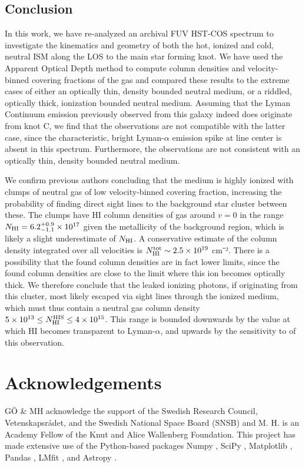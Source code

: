 \documentclass[twocolumn]{aastex61}
\begin{document}
\subsection{Conclusion}\label{conclusion}

In this work, we have re-analyzed an archival FUV HST-COS spectrum to
investigate the kinematics and geometry of both the hot, ionized and
cold, neutral ISM along the LOS to the main star forming knot. We have
used the Apparent Optical Depth method to compute column densities and
velocity-binned covering fractions of the gas and compared these results
to the extreme cases of either an optically thin, density bounded
neutral medium, or a riddled, optically thick, ionization bounded
neutral medium. Assuming that the Lyman Continuum emission previously
observed from this galaxy indeed does originate from knot C, we find
that the observations are not compatible with the latter case, since the
characteristic, bright Lyman-$\alpha$ emission spike at line center is
absent in this spectrum. Furthermore, the observations are not
consistent with an optically thin, density bounded neutral medium.

We confirm previous authors concluding that the medium is highly ionized
with clumps of neutral gas of low velocity-binned covering fraction,
increasing the probability of finding direct sight lines to the
background star cluster between these. The clumps have HI column
densities of gas around $v=0$ in the range
$N_{\rm HI} = 6.2^{+0.9}_{-1.1} \times 10^{17}$ given the metallicity of
the background  region, which is likely a slight underestimate
of $N_{\rm HI}$. A conservative estimate of the  column
density integrated over all velocities is
$N_{\rm H I}^{\rm tot} \sim 2.5 \times 10^{19}$ cm⁻². There is a
possibility that the found column densities are in fact lower limits,
since the found  column densities are close to the limit
where this ion becomes optically thick. We therefore conclude that the
leaked ionizing photons, if originating from this cluster, most likely
escaped via sight lines through the ionized medium, which must thus
contain a neutral gas column density
$5 \times 10^{13} \leq N_{\rm HI}^{\rm HIS} \leq 4 \times 10^{15}$. This
range is bounded downwards by the value at which HI becomes transparent
to Lyman-$\alpha$, and upwards by the sensitivity to  of this
observation.

\section*{Acknowledgements}\label{acknowledgements}

GÖ \& MH acknowledge the support of the Swedish Research Council,
Vetenskapsrådet, and the Swedish National Space Board (SNSB) and M. H.
is an Academy Fellow of the Knut and Alice Wallenberg Foundation. This
project has made extensive use of the Python-based packages Numpy
\citep{Numpy}, SciPy \citep{SciPy}, Matplotlib \citep{Matplotlib},
Pandas \citep{Pandas}, LMfit \citep{lmfit2014}, and Astropy
\citep{Astropy2013}.


\end{document}
